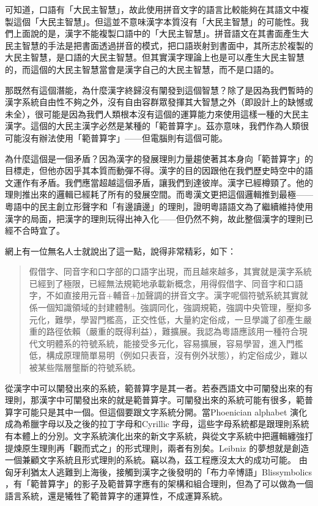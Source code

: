 \documentclass[a5paper, 12pt, openany]{book} %
\begin{document}
可知道，口語有「大民主智慧」，故此使用拼音文字的語言比較能夠在其語文中複製這個「大民主智慧」。但這並不意味漢字本質沒有「大民主智慧」的可能性。我們上面說的是，漢字不能複製口語中的「大民主智慧」。拼音語文在其書面產生大民主智慧的手法是把書面透過拼音的模式，把口語崁射到書面中，其所志於複製的大民主智慧，是口語的大民主智慧。但其實漢字理論上也是可以產生大民主智慧的，而這個的大民主智慧當會是漢字自己的大民主智慧，而不是口語的。

那既然有這個潛能，為什麼漢字終歸沒有闡發到這個智慧？除了是因為我們暫時的漢字系統自由性不夠之外，沒有自由容群眾發揮其大智慧之外（即設計上的缺憾或未全），很可能是因為我們人類根本沒有這個的運算能力來使用這樣一種的大民主漢字。這個的大民主漢字必然是某種的「範普算字」。茲亦意味，我們作為人類很可能沒有辦法使用「範普算字」——但電腦則有這個可能。

為什麼這個是一個矛盾？因為漢字的發展理則力量趨使著其本身向「範普算字」的目標走，但他亦因乎其本質而動彈不得。漢字的目的因跟他在我們歷史時空中的語文運作有矛盾。我們應當超越這個矛盾，讓我們到達彼岸。漢字已經樽頸了。他的理則推出來的邏輯已經耗了所有的發展空間。而粵漢文更把這個邏輯推到最極——粵語中的民主創立形聲字和「有邊讀邊」的理則，證明粵語語文為了繼續維持使用漢字的局面，把漢字的理則玩得出神入化——但仍然不夠，故此整個漢字的理則已經不合時宜了。

網上有一位無名人士就說出了這一點，說得非常精彩，如下：

\begin{quotation}
假借字、同音字和口字部的口語字出現，而且越來越多，其實就是漢字系統已經到了極限，已經無法規範地承載新概念，用得假借字、同音字和口語字，不如直接用元音+輔音+加聲調的拼音文字。漢字呢個符號系統其實就係一個知識領域的封建體制。強調同化，強調規範，強調中央管理，壓抑多元化，難學，學習門檻高，正交性低，大量約定俗成，一旦學識了卻產生嚴重的路徑依賴（嚴重的既得利益），難擴展。我認為粵語應該用一種符合現代文明體系的符號系統，能接受多元化，容易擴展，容易學習，進入門檻低，構成原理簡單易明（例如只表音，沒有例外狀態），約定俗成少，難以被某些階層壟斷的符號系統。 

\end{quotation}

從漢字中可以闡發出來的系統，範普算字是其一者。若泰西語文中可闡發出來的有理則，那漢字中可闡發出來的就是範普算字。可闡發出來的系統可能有很多，範普算字可能只是其中一個。但這個要跟文字系統分開。當Phoenician alphabet 演化成為希臘字母以及之後的拉丁字母和Cyrillic 字母，這些字母系統都是跟理則系統有本體上的分別。文字系統演化出來的新文字系統，與從文字系統中把邏輯纏強打提煉原生理則再「觀而式之」的形式理則，兩者有別矣。Leibniz 的夢想就是創造一個兼顧文字系統且形式理則的系統。竊以為，茲工程應沒太大的成功可能。 由匈牙利猶太人逃難到上海後，接觸到漢字之後發明的「布力辛博語」Blissymbolics ，有「範普算字」的影子及範普算字應有的架構和組合理則，但為了可以做為一個語言系統，還是犧牲了範普算字的運算性，不成運算系統。 
\end{document}
